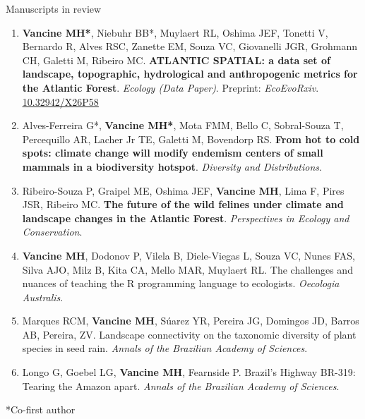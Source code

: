 \documentclass{resume}
\begin{document}
\begin{rSection}{Manuscripts in review}

\begin{enumerate} 

\item {\bf Vancine MH*}, Niebuhr BB*, Muylaert RL, Oshima JEF, Tonetti V, Bernardo R, Alves RSC, Zanette EM, Souza VC, Giovanelli JGR, Grohmann CH, Galetti M, Ribeiro MC. {\bf ATLANTIC SPATIAL: a data set of landscape, topographic, hydrological and anthropogenic metrics for the Atlantic Forest}. {\it Ecology (Data Paper)}. Preprint: {\it EcoEvoRxiv}. \href{https://doi.org/10.32942/X26P58}{\underline{10.32942/X26P58}}

\item Alves-Ferreira G*, {\bf Vancine MH*}, Mota FMM, Bello C, Sobral-Souza T, Percequillo AR, Lacher Jr TE, Galetti M, Bovendorp RS. {\bf From hot to cold spots: climate change will modify endemism centers of small mammals in a biodiversity hotspot}. {\it Diversity and Distributions}.

\item Ribeiro-Souza P, Graipel ME, Oshima JEF, {\bf Vancine MH}, Lima F, Pires JSR, Ribeiro MC. {\bf The future of the wild felines under climate and landscape changes in the Atlantic Forest}. {\it Perspectives in Ecology and Conservation}.

\item {\bf Vancine MH}, Dodonov P, Vilela B, Diele-Viegas L, Souza VC, Nunes FAS, Silva AJO, Milz B, Kita CA, Mello MAR, Muylaert RL. The challenges and nuances of teaching the R programming language to ecologists. {\it Oecologia Australis}.

\item Marques RCM, {\bf Vancine MH}, Súarez YR, Pereira JG, Domingos JD, Barros AB, Pereira, ZV. Landscape connectivity on the taxonomic diversity of plant species in seed rain. {\it Annals of the Brazilian Academy of Sciences}.

\item Longo G, Goebel LG, {\bf Vancine MH}, Fearnside P. Brazil’s Highway BR-319: Tearing the Amazon apart. {\it Annals of the Brazilian Academy of Sciences}.

\end{enumerate} 

*Co-first author

\end{rSection}

\end{document}
